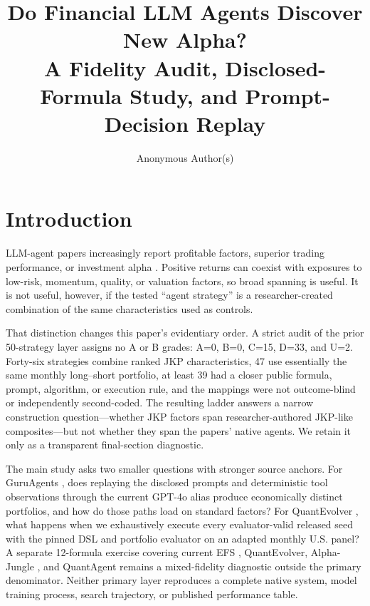 \documentclass[sigconf,anonymous]{acmart}
\title[Do Financial LLM Agents Discover New Alpha?]{Do Financial LLM Agents Discover New Alpha?\\A Fidelity Audit, Disclosed-Formula Study, and Prompt-Decision Replay}
\author{Anonymous Author(s)}
\affiliation{\institution{Anonymous Institution}}
\begin{document}
\maketitle

\section{Introduction}

LLM-agent papers increasingly report profitable factors, superior trading performance, or investment alpha \cite{CensusACL2024findingsacl233,CensusArxiv250216789,CensusACL2025emnlpdemos14,CensusArxiv260515412,CensusDOI10114537682923770377}. Positive returns can coexist with exposures to low-risk, momentum, quality, or valuation factors, so broad spanning is useful. It is not useful, however, if the tested ``agent strategy'' is a researcher-created combination of the same characteristics used as controls.

That distinction changes this paper's evidentiary order. A strict audit of the prior 50-strategy layer assigns no A or B grades: A=0, B=0, C=15, D=33, and U=2. Forty-six strategies combine ranked JKP characteristics, 47 use essentially the same monthly long--short portfolio, at least 39 had a closer public formula, prompt, algorithm, or execution rule, and the mappings were not outcome-blind or independently second-coded. The resulting ladder answers a narrow construction question---whether JKP factors span researcher-authored JKP-like composites---but not whether they span the papers' native agents. We retain it only as a transparent final-section diagnostic.

The main study asks two smaller questions with stronger source anchors. For GuruAgents \cite{CensusArxiv251001664}, does replaying the disclosed prompts and deterministic tool observations through the current GPT-4o alias produce economically distinct portfolios, and how do those paths load on standard factors? For QuantEvolver \cite{CensusArxiv260515412}, what happens when we exhaustively execute every evaluator-valid released seed with the pinned DSL and portfolio evaluator on an adapted monthly U.S. panel? A separate 12-formula exercise covering current EFS \cite{CensusArxiv250717211}, QuantEvolver, Alpha-Jungle \cite{CensusArxiv250511122}, and QuantAgent \cite{CensusArxiv240203755} remains a mixed-fidelity diagnostic outside the primary denominator. Neither primary layer reproduces a complete native system, model training process, search trajectory, or published performance table.
\end{document}
